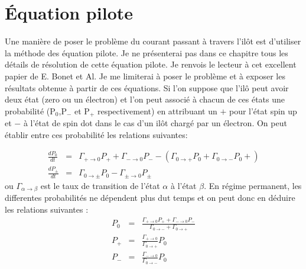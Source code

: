 \section{\'Equation pilote}
Une manière de poser le problème du courant passant à travers l'il\^ot est d'utiliser la méthode des équation pilote. Je ne présenterai pas dans ce chapitre tous les détails de résolution de cette équation pilote. Je renvois le lecteur à cet excellent papier de E. Bonet et Al. Je me limiterai à poser le problème et à exposer les résultats obtenue à partir de ces équations.
Si l'on suppose que l'il\^o peut avoir deux état (zero ou un électron) et l'on peut associé à chacun de ces états une probabilité (P$_0$,P$_-$ et P$_+$ respectivement) en attribuant un $+$ pour l'état spin up et $-$ à l'état de spin dot dans le cas d'un il\^ot chargé par un électron. On peut établir entre ces probabilité les relations suivantes:

\begin{eqnarray}
\frac{dP_0}{dt} &=& \Gamma_{+ \rightarrow 0}P_+ + \Gamma_{- \rightarrow 0}P_-  -(\Gamma_{0 \rightarrow +}P_0 + \Gamma_{0 \rightarrow -}P_0 + ) \nonumber \\
\frac{dP_\pm}{dt} &=& \Gamma_{0 \rightarrow \pm}P_0 - \Gamma_{\pm \rightarrow 0}P_\pm \nonumber
\end{eqnarray}
ou $\Gamma_{\alpha \rightarrow \beta}$ est le taux de transition de l'état $\alpha$ à l'état $\beta$. En régime permanent, les differentes probabilités ne dépendent plus dut temps et on peut donc en déduire les relations suivantes :
\begin{eqnarray}
P_0 &=& \frac{\Gamma_{+ \rightarrow 0}P_{+} + \Gamma_{- \rightarrow 0}P_{-}}{\Gamma_{0 \rightarrow -} + \Gamma_{0 \rightarrow +} }\\
P_{+} &=& \frac{\Gamma_{+ \rightarrow 0}}{\Gamma_{0 \rightarrow +}}P_0 \\
P_{-} &=& \frac{\Gamma_{- \rightarrow 0}}{\Gamma_{0 \rightarrow -}}P_0
\end{eqnarray}



\newpage 

